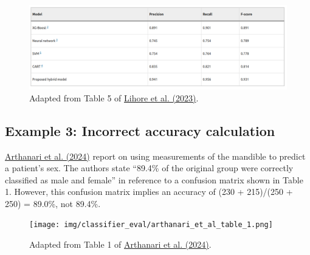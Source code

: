 \documentclass[letterpaper, 12pt]{article}
\begin{document}
\begin{figure}[h!tbp]
    \centering
    \includegraphics[width=\textwidth]{img/classifier_eval/lihore_f1.png}
    \caption*{Adapted from Table 5 of \href{https://doi.org/10.1038/s41598-023-41314-y}{Lihore et al. (2023)}.}
\end{figure}

\subsection*{Example 3: Incorrect accuracy calculation}

\href{https://doi.org/10.7759/cureus.58500}{Arthanari et al. (2024)} report on using measurements of the mandible to predict a patient's sex. The authors state ``89.4\% of the original group were correctly classified as male and female'' in reference to a confusion matrix shown in Table 1. However, this confusion matrix implies an accuracy of (230 + 215)/(250 + 250) = 89.0\%, not 89.4\%.

\begin{figure}[h!tbp]
    \centering
    \texttt{[image: img/classifier\_eval/arthanari\_et\_al\_table\_1.png]}
    \caption*{Adapted from Table 1 of \href{https://doi.org/10.7759/cureus.58500}{Arthanari et al. (2024)}.}
\end{figure}
\end{document}
